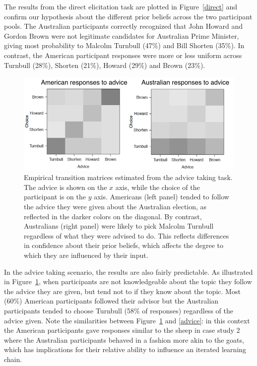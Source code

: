 \documentclass[doc]{apa6}
\begin{document}
The results from the direct elicitation task are plotted in Figure~\ref{direct} and confirm our hypothesis about the different prior beliefs across the two participant pools. The Australian participants correctly recognized that John Howard and Gordon Brown were not legitimate candidates for Australian Prime Minister, giving most probability to Malcolm Turnbull (47\%) and Bill Shorten (35\%). In contrast, the American participant responses were more or less uniform across Turnbull (28\%), Shorten (21\%), Howard (29\%) and Brown (23\%). 

\begin{figure}[t]
\begin{center}
\includegraphics[width=12cm]{transitionsozelection.png}
\caption{\small{Empirical transition matrices estimated from the {\sc advice taking} task. The advice is shown on the $x$ axis, while the choice of the participant is on the $y$ axis. Americans (left panel) tended to follow the advice they were given about the Australian election, as reflected in the darker colors on the diagonal. By contrast, Australians (right panel) were likely to pick Malcolm Turnbull regardless of what they were advised to do. This reflects differences in confidence about their prior beliefs, which affects the degree to which they are influenced by their input.}}
\label{transitionsozelection}
\end{center}
\end{figure}

In the {\sc advice taking} scenario, the results are also fairly predictable. As illustrated in Figure~\ref{transitionsozelection}, when participants are not knowledgeable about the topic they follow the advice they are given, but tend not to if they know about the topic. Most (60\%) American participants followed their advisor but the Australian participants tended to choose Turnbull (58\% of responses) regardless of the advice given. Note the similarities between Figure~\ref{transitionsozelection} and \ref{advice}: in this context the American participants gave responses similar to the {\sc sheep} in case study 2 where the Australian participants behaved in a fashion more akin to the {\sc goats}, which has implications for their relative ability to influence an iterated learning chain.
\end{document}

